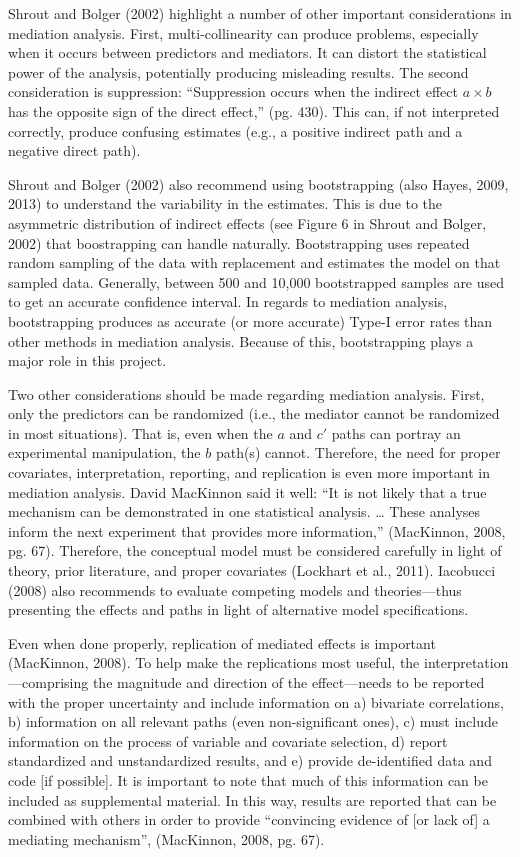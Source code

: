 \documentclass[]{DissertateUSU}
\begin{document}
Shrout and Bolger (2002) highlight a number of other important
considerations in mediation analysis. First, multi-collinearity can
produce problems, especially when it occurs between predictors and
mediators. It can distort the statistical power of the analysis,
potentially producing misleading results. The second consideration is
suppression: ``Suppression occurs when the indirect effect
\(a \times b\) has the opposite sign of the direct effect,'' (pg. 430).
This can, if not interpreted correctly, produce confusing estimates
(e.g., a positive indirect path and a negative direct path).

Shrout and Bolger (2002) also recommend using bootstrapping (also Hayes,
2009, 2013) to understand the variability in the estimates. This is due
to the asymmetric distribution of indirect effects (see Figure 6 in
Shrout and Bolger, 2002) that boostrapping can handle naturally.
Bootstrapping uses repeated random sampling of the data with replacement
and estimates the model on that sampled data. Generally, between 500 and
10,000 bootstrapped samples are used to get an accurate confidence
interval. In regards to mediation analysis, bootstrapping produces as
accurate (or more accurate) Type-I error rates than other methods in
mediation analysis. Because of this, bootstrapping plays a major role in
this project.

Two other considerations should be made regarding mediation analysis.
First, only the predictors can be randomized (i.e., the mediator cannot
be randomized in most situations). That is, even when the \(a\) and
\(c'\) paths can portray an experimental manipulation, the \(b\) path(s)
cannot. Therefore, the need for proper covariates, interpretation,
reporting, and replication is even more important in mediation analysis.
David MacKinnon said it well: ``It is not likely that a true mechanism
can be demonstrated in one statistical analysis. \ldots{} These analyses
inform the next experiment that provides more information,'' (MacKinnon,
2008, pg. 67). Therefore, the conceptual model must be considered
carefully in light of theory, prior literature, and proper covariates
(Lockhart et al., 2011). Iacobucci (2008) also recommends to evaluate
competing models and theories---thus presenting the effects and paths in
light of alternative model specifications.

Even when done properly, replication of mediated effects is important
(MacKinnon, 2008). To help make the replications most useful, the
interpretation---comprising the magnitude and direction of the
effect---needs to be reported with the proper uncertainty and include
information on a) bivariate correlations, b) information on all relevant
paths (even non-significant ones), c) must include information on the
process of variable and covariate selection, d) report standardized and
unstandardized results, and e) provide de-identified data and code {[}if
possible{]}. It is important to note that much of this information can
be included as supplemental material. In this way, results are reported
that can be combined with others in order to provide ``convincing
evidence of {[}or lack of{]} a mediating mechanism'', (MacKinnon, 2008,
pg. 67).
\end{document}
